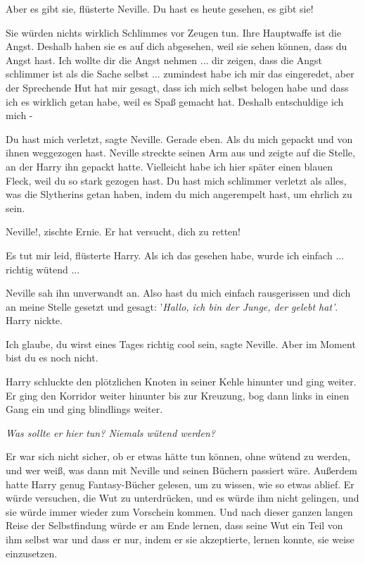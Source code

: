 \glqq{}Aber es gibt sie\grqq{}, flüsterte Neville. \glqq{}Du hast es heute
gesehen, es gibt sie!\grqq{}

\glqq{}Sie würden nichts wirklich Schlimmes vor Zeugen tun. Ihre Hauptwaffe ist
die Angst. Deshalb haben sie es auf dich abgesehen, weil sie sehen können, dass
du Angst hast. Ich wollte dir die Angst nehmen ... dir zeigen, dass die Angst
schlimmer ist als die Sache selbst ... zumindest habe ich mir das eingeredet,
aber der Sprechende Hut hat mir gesagt, dass ich mich selbst belogen habe und
dass ich es wirklich getan habe, weil es Spaß gemacht hat. Deshalb entschuldige
ich mich -\grqq{}

\glqq{}Du hast mich verletzt\grqq{}, sagte Neville. \glqq{}Gerade eben. Als du
mich gepackt und von ihnen weggezogen hast.\grqq{} Neville streckte seinen Arm
aus und zeigte auf die Stelle, an der Harry ihn gepackt hatte. \glqq{}Vielleicht
habe ich hier später einen blauen Fleck, weil du so stark gezogen hast. Du hast
mich schlimmer verletzt als alles, was die Slytherins getan haben, indem du mich
angerempelt hast, um ehrlich zu sein.\grqq{}

\glqq{}Neville!\grqq{}, zischte Ernie. \glqq{}Er hat versucht, dich zu
retten!\grqq{}

\glqq{}Es tut mir leid\grqq{}, flüsterte Harry. \glqq{}Als ich das gesehen habe,
wurde ich einfach ... richtig wütend ...\grqq{}

Neville sah ihn unverwandt an. \glqq{}Also hast du mich einfach rausgerissen und
dich an meine Stelle gesetzt und gesagt: '\emph{Hallo, ich bin der Junge, der
gelebt hat'}.\grqq{} Harry nickte.

\glqq{}Ich glaube, du wirst eines Tages richtig cool sein\grqq{}, sagte Neville.
\glqq{}Aber im Moment bist du es noch nicht.\grqq{}

Harry schluckte den plötzlichen Knoten in seiner Kehle hinunter und ging weiter.
Er ging den Korridor weiter hinunter bis zur Kreuzung, bog dann links in einen
Gang ein und ging blindlings weiter.

\emph{Was sollte er hier tun? Niemals wütend werden?}

Er war sich nicht sicher, ob er etwas hätte tun können, ohne wütend zu werden,
und wer weiß, was dann mit Neville und seinen Büchern passiert wäre. Außerdem
hatte Harry genug Fantasy-Bücher gelesen, um zu wissen, wie so etwas ablief. Er
würde versuchen, die Wut zu unterdrücken, und es würde ihm nicht gelingen, und
sie würde immer wieder zum Vorschein kommen. Und nach dieser ganzen langen Reise
der Selbstfindung würde er am Ende lernen, dass seine Wut ein Teil von ihm
selbst war und dass er nur, indem er sie akzeptierte, lernen konnte, sie weise
einzusetzen.

